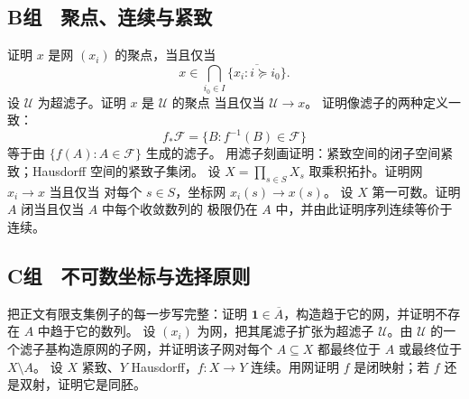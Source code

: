 \subsection*{B组　聚点、连续与紧致}
\begin{enumerate}[label=\textbf{\thechapter.\arabic*.},resume]
 证明 \(x\) 是网 \((x_i)\) 的聚点，当且仅当
 \[
  x\in\bigcap_{i_0\in I}\overline{\{x_i:i\succcurlyeq i_0\}}.
 \]
 设 \(\mathcal U\) 为超滤子。证明 \(x\) 是 \(\mathcal U\) 的聚点
 当且仅当 \(\mathcal U\to x\)。
 证明像滤子的两种定义一致：
 \[
 f_*\mathcal F=\{B:f^{-1}(B)\in\mathcal F\}
 \]
 等于由 \(\{f(A):A\in\mathcal F\}\) 生成的滤子。
 用滤子刻画证明：紧致空间的闭子空间紧致；Hausdorff 空间的紧致子集闭。
 设 \(X=\prod_{s\in S}X_s\) 取乘积拓扑。证明网 \(x_i\to x\) 当且仅当
 对每个 \(s\in S\)，坐标网 \(x_i(s)\to x(s)\)。
 设 \(X\) 第一可数。证明 \(A\) 闭当且仅当 \(A\) 中每个收敛数列的
 极限仍在 \(A\) 中，并由此证明序列连续等价于连续。
\end{enumerate}

\subsection*{C组　不可数坐标与选择原则}
\begin{enumerate}[label=\textbf{\thechapter.\arabic*.},resume]
 把正文有限支集例子的每一步写完整：证明
 \(\boldsymbol1\in\overline A\)，构造趋于它的网，并证明不存在
 \(A\) 中趋于它的数列。
 设 \((x_i)\) 为网，把其尾滤子扩张为超滤子 \(\mathcal U\)。由
 \(\mathcal U\) 的一个滤子基构造原网的子网，并证明该子网对每个
 \(A\subseteq X\) 都最终位于 \(A\) 或最终位于 \(X\setminus A\)。
 设 \(X\) 紧致、\(Y\) Hausdorff，\(f:X\to Y\) 连续。用网证明
 \(f\) 是闭映射；若 \(f\) 还是双射，证明它是同胚。
\end{enumerate}
